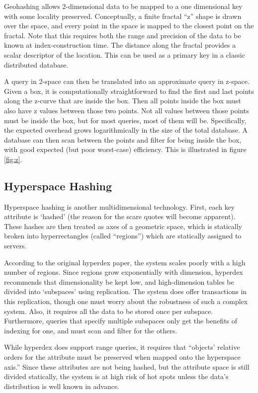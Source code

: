 \documentclass[11pt]{article}
\begin{document}
Geohashing allows 2-dimensional data to be mapped to a one dimensional key with some locality preserved.  Conceptually, a finite fractal ``z'' shape is drawn over the space, and every point in the space is mapped to the closest point on the fractal.  Note that this requires both the range and precision of the data to be known at index-construction time.  The distance along the fractal provides a scalar descriptor of the location.  This can be used as a primary key in a classic distributed database.\cite{gh}

A query in 2-space can then be translated into an approximate query in z-space.  Given a box, it is computationally straightforward to find the first and last points along the z-curve that are inside the box.  Then all points inside the box must also have z values between those two points.  Not all values between those points must be inside the box, but for most queries, most of them will be.  Specifically, the expected overhead grows logarithmically in the size of the total database\cite{ghs}.  A database can then scan between the points and filter for being inside the box, with good expected (but poor worst-case) efficiency.  This is illustrated in figure \ref{fig:z}.

\subsection{Hyperspace Hashing}

Hyperspace hashing is another multidimensional technology. First, each key attribute is `hashed' (the reason for the scare quotes will become apparent). These hashes are then treated as axes of a geometric space, which is statically broken into hyperrectangles (called ``regions'') which are statically assigned to servers.\cite{hh}

According to the original hyperdex paper, the system scales poorly with a high number of regions. Since regions grow exponentially with dimension, hyperdex recommends that dimen\-sionality be kept low, and high-dimension tables be divided into `subspaces' using replication. The system does offer transactions in this replication, though one must worry about the robustness of such a complex system. Also, it requires all the data to be stored once per subspace. Furthermore, queries that specify multiple subspaces only get the benefits of indexing for one, and must scan and filter for the others.

While hyperdex does support range queries, it requires that ``objects' relative orders for the attribute must be preserved when mapped onto the hyperspace axis.'' Since these attributes are not being hashed, but the attribute space is still divided statically, the system is at high risk of hot spots unless the data's distribution is well known in advance.
\end{document}
